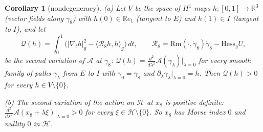 \documentclass[11pt]{article}
\newtheorem{corollary}[theorem]{Corollary}
\theoremstyle{definition}
\begin{document}
\begin{corollary}[nondegeneracy]\label{cor:nondeg}
(a) Let $V$ be the space of $H^1$ maps $h:[0,1]\to\mathbb R^3$ (vector fields along $\gamma_8$) with
$h(0)\in\mathbb R e_1$ (tangent to $E$) and $h(1)\in I$ (tangent to $I$), and let
\[
\mathcal Q(h)=\int_0^1\bigl(|\nabla_th|_g^2-\langle\mathcal R_8h,h\rangle_g\bigr)\,dt,\qquad
\mathcal R_8=\mathrm{Rm}(\cdot,\dot\gamma_8)\dot\gamma_8-\mathrm{Hess}_gU,
\]
be the second variation of $\mathcal A$ at $\gamma_8$: $\mathcal Q(h)=\frac{d^2}{d\lambda^2}\mathcal A(\gamma_\lambda)|_{\lambda=0}$
for every smooth family of paths $\gamma_\lambda$ from $E$ to $I$ with $\gamma_0=\gamma_8$ and
$\partial_\lambda\gamma_\lambda|_{\lambda=0}=h$. Then $\mathcal Q(h)>0$ for every $h\in V\setminus\{0\}$.

(b) The second variation of the action on $\mathcal H$ at $x_8$ is positive definite:
$\frac{d^2}{d\lambda^2}\mathcal A(x_8+\lambda\xi)|_{\lambda=0}>0$ for every $\xi\in\mathcal H\setminus\{0\}$. So $x_8$ has
Morse index $0$ and nullity $0$ in $\mathcal H$.
\end{corollary}
\end{document}
